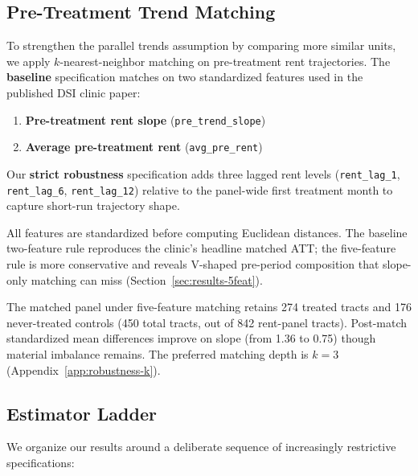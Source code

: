 \subsection{Pre-Treatment Trend Matching}\label{sec:methods-matching}

To strengthen the parallel trends assumption by comparing more similar units, we apply $k$-nearest-neighbor matching on pre-treatment rent trajectories. The \textbf{baseline} specification matches on two standardized features used in the published DSI clinic paper:
\begin{enumerate}
  \item \textbf{Pre-treatment rent slope} (\texttt{pre\_trend\_slope})
  \item \textbf{Average pre-treatment rent} (\texttt{avg\_pre\_rent})
\end{enumerate}
Our \textbf{strict robustness} specification adds three lagged rent levels (\texttt{rent\_lag\_1}, \texttt{rent\_lag\_6}, \texttt{rent\_lag\_12}) relative to the panel-wide first treatment month to capture short-run trajectory shape.

All features are standardized before computing Euclidean distances. The baseline two-feature rule reproduces the clinic's headline matched ATT; the five-feature rule is more conservative and reveals V-shaped pre-period composition that slope-only matching can miss (Section~\ref{sec:results-5feat}).

The matched panel under five-feature matching retains 274 treated tracts and 176 never-treated controls (450 total tracts, out of 842 rent-panel tracts). Post-match standardized mean differences improve on slope (from 1.36 to 0.75) though material imbalance remains. The preferred matching depth is $k = 3$ (Appendix~\ref{app:robustness-k}).

\subsection{Estimator Ladder}

We organize our results around a deliberate sequence of increasingly restrictive specifications:

